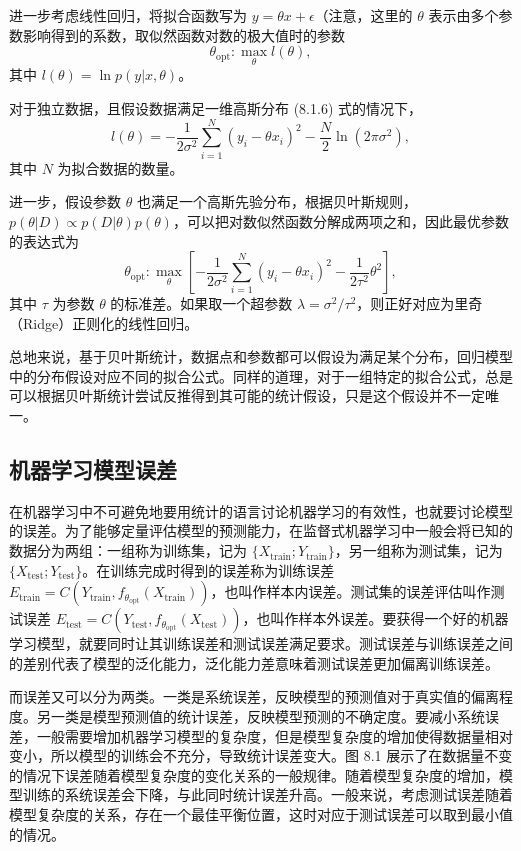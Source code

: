 进一步考虑线性回归，将拟合函数写为 $y=\theta x+\epsilon$（注意，这里的 $\theta$ 表示由多个参数影响得到的系数，取似然函数对数的极大值时的参数
\begin{equation}
\theta_{\mathrm{opt}}:\max_\theta l(\theta),
\tag{8.1.8}
\end{equation}
其中 $l(\theta)=\ln p(y|x,\theta)$。

对于独立数据，且假设数据满足一维高斯分布 (8.1.6) 式的情况下，
\begin{equation}
l(\theta)=-\frac1{2\sigma^2}\sum_{i=1}^{N}(y_i-\theta x_i)^2-\frac N2\ln(2\pi\sigma^2),
\tag{8.1.9}
\end{equation}
其中 $N$ 为拟合数据的数量。

进一步，假设参数 $\theta$ 也满足一个高斯先验分布，根据贝叶斯规则，$p(\theta|D)\propto p(D|\theta)p(\theta)$，可以把对数似然函数分解成两项之和，因此最优参数的表达式为
\begin{equation}
\theta_{\mathrm{opt}}:\max_\theta\left[-\frac1{2\sigma^2}\sum_{i=1}^{N}(y_i-\theta x_i)^2-\frac1{2\tau^2}\theta^2\right],
\tag{8.1.10}
\end{equation}
其中 $\tau$ 为参数 $\theta$ 的标准差。如果取一个超参数 $\lambda=\sigma^2/\tau^2$，则正好对应为里奇（Ridge）正则化的线性回归。

总地来说，基于贝叶斯统计，数据点和参数都可以假设为满足某个分布，回归模型中的分布假设对应不同的拟合公式。同样的道理，对于一组特定的拟合公式，总是可以根据贝叶斯统计尝试反推得到其可能的统计假设，只是这个假设并不一定唯一。

\subsection{机器学习模型误差}
在机器学习中不可避免地要用统计的语言讨论机器学习的有效性，也就要讨论模型的误差。为了能够定量评估模型的预测能力，在监督式机器学习中一般会将已知的数据分为两组：一组称为训练集，记为 $\{X_{\mathrm{train}};Y_{\mathrm{train}}\}$，另一组称为测试集，记为 $\{X_{\mathrm{test}};Y_{\mathrm{test}}\}$。在训练完成时得到的误差称为训练误差 $E_{\mathrm{train}}=C(Y_{\mathrm{train}},f_{\theta_{\mathrm{opt}}}(X_{\mathrm{train}}))$，也叫作样本内误差。测试集的误差评估叫作测试误差 $E_{\mathrm{test}}=C(Y_{\mathrm{test}},f_{\theta_{\mathrm{opt}}}(X_{\mathrm{test}}))$，也叫作样本外误差。要获得一个好的机器学习模型，就要同时让其训练误差和测试误差满足要求。测试误差与训练误差之间的差别代表了模型的泛化能力，泛化能力差意味着测试误差更加偏离训练误差。

而误差又可以分为两类。一类是系统误差，反映模型的预测值对于真实值的偏离程度。另一类是模型预测值的统计误差，反映模型预测的不确定度。要减小系统误差，一般需要增加机器学习模型的复杂度，但是模型复杂度的增加使得数据量相对变小，所以模型的训练会不充分，导致统计误差变大。图 8.1 展示了在数据量不变的情况下误差随着模型复杂度的变化关系的一般规律。随着模型复杂度的增加，模型训练的系统误差会下降，与此同时统计误差升高。一般来说，考虑测试误差随着模型复杂度的关系，存在一个最佳平衡位置，这时对应于测试误差可以取到最小值的情况。

